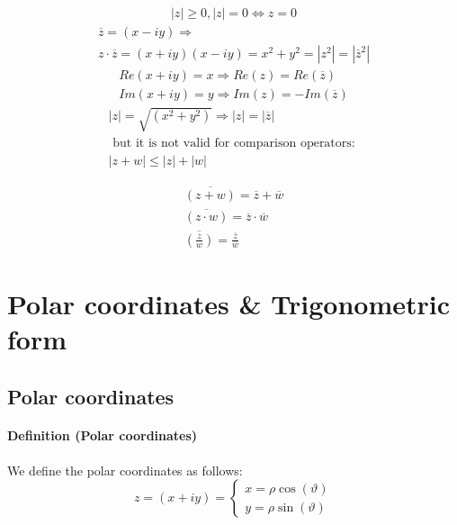 \documentclass[a4paper]{report}
\begin{document}
\begin{gather}
\left | z \right | \geq 0, 
\left | z \right | = 0  \Leftrightarrow z = 0
\end{gather}
\begin{gather}
\overline{z} = (x - iy) \Longrightarrow\\
z \cdot \overline{z} = (x + iy)(x - iy) = x^{2} + y^{2} = \left | z^{2} \right| = \left | \overline{z}^{2} \right|
\end{gather}
\begin{gather}
Re(x + iy) = x \Longrightarrow Re(z) = Re(\overline{z})\\
Im(x + iy) = y \Longrightarrow Im(z) = -Im(\overline{z})
\end{gather}
\begin{gather}
\left | z \right | = \sqrt{(x^{2} + y^{2})} \Longrightarrow \left | z \right | = \left | \overline{z} \right |\\
 \text{ but it is not valid for comparison operators: }
\\\left | z+w \right |\leq \left | z \right | + \left | w \right |
\end{gather}

\begin{gather}
\overline{\left(z + w\right)} = \overline{z} + \overline{w}\\
\overline{\left(z \cdot w\right)} = \overline{z} \cdot \overline{w}\\
\overline{\left(\frac{z}{w}\right)} = \frac{\overline{z}}{\overline{w}}
\end{gather}


\section{\textbf{Polar coordinates \& Trigonometric form}}
\subsection{\textbf{Polar coordinates}}
\paragraph{\textbf{Definition (Polar coordinates)}}
We define the polar coordinates as follows:
\[
z=\left(x + iy\right) =
\begin{cases}
x = \rho\cos(\vartheta)\\
y = \rho\sin(\vartheta)
\end{cases}
\]
\end{document}
